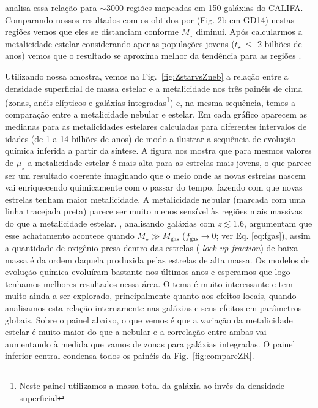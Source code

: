 \citet{Sanchez.etal.2013a} analisa essa relação para $\sim 3000$ regiões \Hii mapeadas em 150
galáxias do CALIFA. Comparando nossos resultados com os obtidos por \citeauthor{Sanchez.etal.2013a}
(Fig. 2b em GD14) nestas regiões vemos que eles se distanciam conforme $M_\star$ diminui.
Após calcularmos a metalicidade estelar considerando apenas populações jovens ($t_\star\ \leq$ 2
bilhões de anos) vemos que o resultado se aproxima melhor da tendência para as regiões \Hii.

Utilizando nossa amostra, vemos na Fig.\ \ref{fig:ZstarvsZneb} a relação entre a densidade
superficial de massa estelar e a metalicidade nos três painéis de cima (zonas, anéis elípticos e
galáxias integradas\footnote{Neste painel utilizamos a massa total da galáxia ao invés da densidade
superficial}) e, na mesma sequência, temos a comparação entre a metalicidade nebular e estelar. Em
cada gráfico aparecem as medianas para as metalicidades estelares calculadas para diferentes
intervalos de idades (de 1 a 14 bilhões de anos) de modo a ilustrar a sequência de evolução química
inferida a partir da síntese. A figura nos mostra que para mesmos valores de $\mu_\star$ a
metalicidade estelar é mais alta para as estrelas mais jovens, o que parece ser um resultado
coerente imaginando que o meio onde as novas estrelas nascem vai enriquecendo quimicamente com o
passar do tempo, fazendo com que novas estrelas tenham maior metalicidade. A metalicidade nebular
(marcada com uma linha tracejada preta) parece ser muito menos sensível às regiões mais massivas do
que a metalicidade estelar. \citet{Zahid.etal.2014a}, analisando galáxias com $z \lesssim 1.6$,
argumentam que esse achatamento acontece quando $M_\star \gg M_{\mathrm{gas}}$ ($f_{\mathrm{gas}}
\to 0$; ver Eq. \ref{eq:fgas}), assim a quantidade de oxigênio presa dentro das estrelas ({\em
lock-up fraction}) de baixa massa é da ordem daquela produzida pelas estrelas de alta massa. Os
modelos de evolução química evoluíram bastante nos últimos anos \citep[e.g., ][]{Lilly.etal.2013a,
Peng.Maiolino.2014a, Ascasibar.etal.2015a, Peng.Maiolino.Cochrane.2015a} e esperamos que logo
tenhamos melhores resultados nessa área. O tema é muito interessante e tem muito ainda a ser
explorado, principalmente quanto aos efeitos locais, quando analisamos esta relação internamente nas
galáxias e seus efeitos em parâmetros globais. Sobre o painel abaixo, o que vemos é que a variação
da metalicidade estelar é muito maior do que a nebular e a correlação entre ambas vai aumentando à
medida que vamos de zonas para galáxias integradas. O painel inferior central condensa todos os
painéis da Fig.\ \ref{fig:compareZR}.

